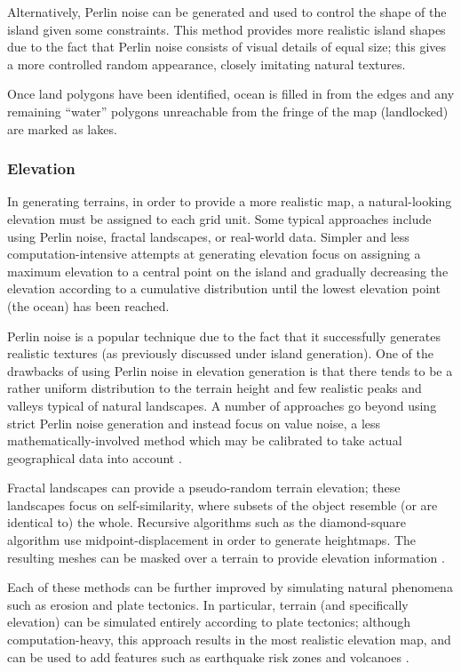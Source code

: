 Alternatively, Perlin noise can be generated and used to control the shape of the island given some constraints. This method provides more realistic island shapes due to the fact that Perlin noise consists of visual details of equal size; this gives a more controlled random appearance, closely imitating natural textures.

Once land polygons have been identified, ocean is filled in from the edges and any remaining ``water'' polygons unreachable from the fringe of the map (landlocked) are marked as lakes.

\subsubsection{Elevation}
In generating terrains, in order to provide a more realistic map, a natural-looking elevation must be assigned to each grid unit. Some typical approaches include using Perlin noise, fractal landscapes, or real-world data. Simpler and less computation-intensive attempts at generating elevation focus on assigning a maximum elevation to a central point on the island and gradually decreasing the elevation according to a cumulative distribution until the lowest elevation point (the ocean) has been reached\cite{Patel:2010:Online}.

Perlin noise is a popular technique due to the fact that it successfully generates  realistic textures (as previously discussed under island generation). One of the drawbacks of using Perlin noise in elevation generation is that there tends to be a rather uniform distribution to the terrain height and few realistic peaks and valleys typical of natural landscapes. A number of approaches go beyond using strict Perlin noise generation and instead focus on value noise, a less mathematically-involved method which may be calibrated to take actual geographical data into account \cite{Parberry:2014}.

Fractal landscapes can provide a pseudo-random terrain elevation; these landscapes focus on self-similarity, where subsets of the object resemble (or are identical to) the whole. Recursive algorithms such as the diamond-square algorithm use midpoint-displacement in order to generate heightmaps. The resulting meshes can be masked over a terrain to provide elevation information \cite{Martz:1997:Online}.

Each of these methods can be further improved by simulating natural phenomena such as erosion and plate tectonics. In particular, terrain (and specifically elevation) can be simulated entirely according to plate tectonics; although computation-heavy, this approach results in the most realistic elevation map, and can be used to add features such as earthquake risk zones and volcanoes \cite{Key}.

